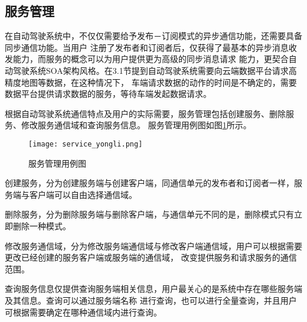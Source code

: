   
\subsection{服务管理}
在自动驾驶系统中，不仅仅需要给予发布－订阅模式的异步通信功能，还需要具备同步通信功能。当用户
注册了发布者和订阅者后，仅获得了最基本的异步消息收发能力，而服务的概念可以为用户提供更为高级的同步消息请求
能力，更契合自动驾驶系统SOA架构风格。在3.1节提到自动驾驶系统需要向云端数据平台请求高精度地图等数据，在这种情况下，
车端请求数据的动作的时间是不确定的，需要数据平台提供请求数据的服务，等待车端发起数据请求。

根据自动驾驶系统通信特点及用户的实际需要，服务管理包括创建服务、删除服务、修改服务通信域和查询服务信息。
服务管理用例图如图\ref{service_yongli}所示。

\begin{figure}[H]
  \centering
  \texttt{[image: service\_yongli.png]}
  \caption{服务管理用例图}
  \label{service_yongli}
\end{figure}

创建服务，分为创建服务端与创建客户端，同通信单元的发布者和订阅者一样，服务端与客户端可以自由选择通信域。

删除服务，分为删除服务端与删除客户端，与通信单元不同的是，删除模式只有立即删除一种模式。

修改服务通信域，分为修改服务端通信域与修改客户端通信域，用户可以根据需要更改已经创建的服务客户端或服务端的通信域，
改变提供服务和请求服务的通信范围。

查询服务信息仅提供查询服务端相关信息，用户最关心的是系统中存在哪些服务端及其信息。查询可以通过服务端名称
进行查询，也可以进行全量查询，并且用户可根据需要确定在哪种通信域内进行查询。


